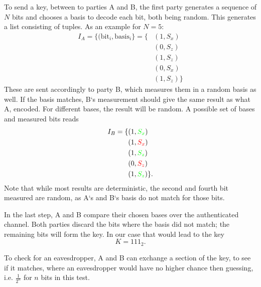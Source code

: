 To send a key, between to parties A and B, the first party generates a sequence of $N$ bits
and chooses a basis to decode each bit, both being random. This generates a list consisting of
tuples. As an example for $N=5$:
\begin{align*}
  I_A = \{ (\text{bit}_i, \text{basis}_i \}
    = \{ &(1, S_x) \\
         &(0, S_z) \\
         &(1, S_z) \\
         &(0, S_x) \\
         &(1, S_z) \}
\end{align*}
These are sent accordingly to party B, which measures them in a random basis as well. If the basis
matches, B`s measurement should give the same result as what A, encoded. For different bases, the
result will be random. A possible set of bases and measured bits reads
\begin{align*}
  I_B
    = \{ &(1, \textcolor{green}{S_x}) \\
         &(1, \textcolor{red}{S_x}) \\
         &(1, \textcolor{green}{S_z}) \\
         &(0, \textcolor{red}{S_z}) \\
         &(1, \textcolor{green}{S_z}) \}.
\end{align*}
Note that while most results are deterministic, the second and fourth bit measured are random, as
A`s and B`s basis do not match for those bits.

In the last step, A and B compare their chosen bases over the authenticated channel. Both parties
discard the bits where the basis did not match; the remaining bits will form the key. In our case
that would lead to the key
\begin{equation}
  K = 111_2.
\end{equation}

To check for an eavesdropper, A and B can exchange a section of the key, to see if it matches, where
an eavesdropper would have no higher chance then guessing, i.e. $\frac{1}{2^n}$ for $n$ bits in this
test.

